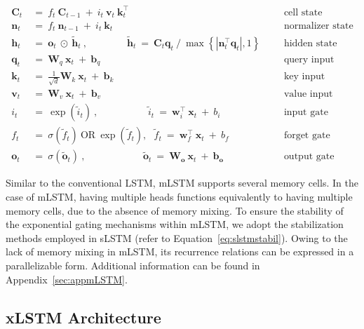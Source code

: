 \begin{align}
\label{eq:mlstm_recurrent_begin}
\mathbf{C}_t \ &= \  f_t \ \mathbf{C}_{t-1} \ + \ 
  i_t \ \mathbf{v}_t \ \mathbf{k}_t^\top & &  &\text{cell state} \\
\mathbf{n}_t \ &= \  f_t \ \mathbf{n}_{t-1} \ + \ 
  i_t \ \mathbf{k}_t & &  &\text{normalizer state} \\
\mathbf{h}_t  \ &= \ \mathbf{o}_t \ \odot \ \tilde{\mathbf{h}}_t
\ , \qquad \qquad 
\tilde{\mathbf{h}}_t \ = \   \mathbf{C}_t \mathbf{q}_t \ / \ 
  \max \left\{ |\mathbf{n}_t^\top \mathbf{q}_t|, 1 \right\} 
   &&&\text{hidden state} \\
\mathbf{q}_t \ &= \ \mathbf{W}_q \ \mathbf{x}_t \ + \ \mathbf{b}_q  & &  &\text{query input} \\
\mathbf{k}_t \ &= \ \frac{1}{\sqrt{d}} \mathbf{W}_k \ \mathbf{x}_t \ + \ \mathbf{b}_k  & &  &\text{key input} \\
\mathbf{v}_t \ &= \ \mathbf{W}_v \ \mathbf{x}_t \ + \ \mathbf{b}_v  & &  &\text{value input} \\
i_t \ &= \ \!\exp \!  \! \left( \tilde{i}_t  \right) \ , 
 \qquad \qquad \ \ \ \ \,
  \tilde{i}_t \ = \ \mathbf{w}^\top_{i} \ \mathbf{x}_t \ + \  b_{i} \ \ \ 
  &&&\text{input gate} \\
f_t \ &= \ \sigma \!  \left(  \tilde{f}_t \right) \ \text{OR} \ \!\exp \!  \! \left(  \tilde{f}_t \right) , \ \ \: \!
\tilde{f}_t \ = \ \mathbf{w}^\top_{f} \ \mathbf{x}_t  \ + \
  b_{f}
  &&& \text{forget gate} \\
\label{eq:mlstm_recurrent_end}
\mathbf{o}_t \ &= \ \sigma \left( \tilde{\mathbf{o}}_t \right) \ , \qquad \qquad \quad \ \ \ \,
  \tilde{\mathbf{o}}_t  \ = \ \mathbf{W}_{\mathbf{o}} \ \mathbf{x}_t \ + \
  \mathbf{b}_{\mathbf{o}}
  &&&\text{output gate} 
\end{align}

Similar to the conventional LSTM, mLSTM supports several memory cells. In the case of mLSTM, having multiple heads functions equivalently to having multiple memory cells, due to the absence of memory mixing. To ensure the stability of the exponential gating mechanisms within mLSTM, we adopt the stabilization methods employed in sLSTM (refer to Equation~\ref{eq:slstmstabil}). Owing to the lack of memory mixing in mLSTM, its recurrence relations can be expressed in a parallelizable form. Additional information can be found in Appendix~\ref{sec:appmLSTM}.

\subsection{xLSTM Architecture}
\label{sec:xLSTMarch}

